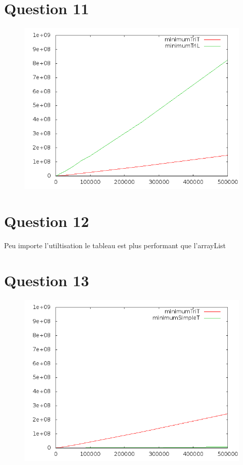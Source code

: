 \documentclass[a4paper,12pt]{report}
\begin{document}
\section*{Question 11}
\begin{figure}[!ht]
	\center
	\includegraphics[scale=0.4]{q11.png}
\end{figure}

\section*{Question 12}
Peu importe l'utiltisation le tableau est plus performant que l'arrayList


\newpage
\section*{Question 13}
\begin{figure}[!ht]
	\center
	\includegraphics[scale=0.4]{q13.png}
\end{figure}
\end{document}
